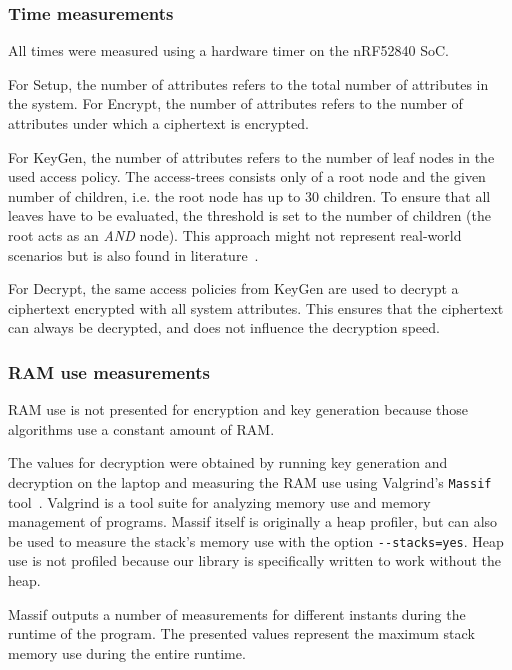 \subsubsection{Time measurements}


All times were measured using a hardware timer on the nRF52840 SoC.

For Setup, the number of attributes refers to the total number of attributes in the system.
For Encrypt, the number of attributes refers to the number of attributes under which a ciphertext is encrypted.

For KeyGen, the number of attributes refers to the number of leaf nodes in the used access policy.
The \glspl{access-tree} consists only of a root node and the given number of children, i.e. the root node has up to 30 children. 
To ensure that all leaves have to be evaluated, the threshold is set to the number of children (the root acts as an \emph{AND} node).
This approach might not represent real-world scenarios but is also found in literature~\cite{girgenti_feasibility_2019}.

For Decrypt, the same access policies from KeyGen are used to decrypt a ciphertext encrypted with all system attributes.
This ensures that the ciphertext can always be decrypted, and does not influence the decryption speed.

\subsubsection{RAM use measurements}


RAM use is not presented for encryption and key generation because those algorithms use a constant amount of RAM.

The values for decryption were obtained by running key generation and decryption on the laptop and measuring the RAM use using Valgrind's \texttt{Massif} tool~\cite{nethercote_massif_nodate}.
Valgrind is a tool suite for analyzing memory use and memory management of programs.
Massif itself is originally a heap profiler, but can also be used to measure the stack's memory use with the option \verb+--stacks=yes+.
Heap use is not profiled because our library is specifically written to work without the heap.

Massif outputs a number of measurements for different instants during the runtime of the program. 
The presented values represent the maximum stack memory use during the entire runtime.

